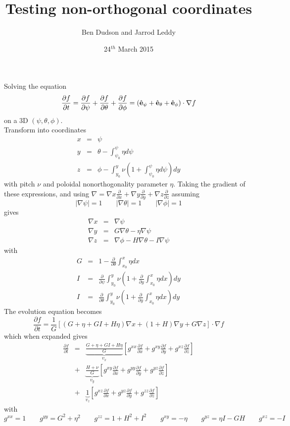 \documentclass[12pt,a4paper]{article}
\title{ Testing non-orthogonal coordinates }%
\author{ Ben Dudson and Jarrod Leddy }%
\date{ 24$^{th}$ March 2015 }%
\begin{document}
\maketitle %
\thispagestyle{fancy}%

Solving the equation
\[
\frac{\partial f}{\partial t} = \frac{\partial f}{\partial \psi} + \frac{\partial f}{\partial \theta} + \frac{\partial f}{\partial \phi} = \left(\hat{\bf{e}}_\psi + \hat{\bf{e}}_\theta + \hat{\bf{e}}_\phi\right)\cdot\nabla f
\]
on a 3D $\left(\psi, \theta, \phi\right)$.\\

Transform into coordinates
\begin{eqnarray*}
x &=& \psi \\
y &=& \theta - \int_{\psi_0}^\psi \eta d\psi  \\
z &=& \phi - \int_{y_0}^y \nu\left( 1 + \int_{\psi_0}^{\psi} \eta d\psi \right) dy
\end{eqnarray*}
with pitch $\nu$ and poloidal nonorthogonality parameter $\eta$. Taking the gradient of these expressions, and
using $\nabla = \nabla x \frac{\partial}{\partial x} + \nabla y \frac{\partial}{\partial y} + \nabla z\frac{\partial}{\partial z}$ assuming
\[
\left|\nabla\psi\right| = 1 \qquad \left|\nabla\theta\right| = 1 \qquad \left|\nabla\phi\right| = 1
\]
gives
\begin{eqnarray*}
\nabla x &=& \nabla \psi \\
\nabla y &=& G\nabla \theta - \eta \nabla \psi \\
\nabla z &=& \nabla \phi - H \nabla \theta - I\nabla\psi
\end{eqnarray*}
with
\begin{eqnarray*}
G &=& 1 - \frac{\partial}{\partial\theta}\int_{x_0}^x \eta dx \\
I &=& \frac{\partial}{\partial\psi}\int_{y_0}^y \nu\left(1+ \frac{\partial}{\partial y}\int_{x_0}^x \eta dx \right) dy \\
I &=& \frac{\partial}{\partial\theta}\int_{y_0}^y \nu\left(1+ \frac{\partial}{\partial y}\int_{x_0}^x \eta dx \right) dy
\end{eqnarray*}
The evolution equation becomes
\[
\frac{\partial f}{\partial t} = \frac{1}{G}\left[ \left( G + \eta+GI+H\eta \right)\nabla x + \left(1 + H\right) \nabla y + G\nabla z \right] \cdot \nabla f
\]
which when expanded gives
\begin{eqnarray*}
\frac{\partial f}{\partial t} &=& \underbrace{\frac{G + \eta+GI+H\eta}{G}}_{v_x}\left[g^{xx} \frac{\partial f}{\partial x} + g^{xy} \frac{\partial f}{\partial y} + g^{xz}\frac{\partial f}{\partial z}\right] \\
&+& \underbrace{\frac{H + \nu}{G}}_{v_y}\left[g^{xy} \frac{\partial f}{\partial x} + g^{yy} \frac{\partial f}{\partial y} + g^{yz}\frac{\partial f}{\partial z}\right] \\
&+& \underbrace{1}_{v_z}\left[g^{xz} \frac{\partial f}{\partial x} + g^{yz}\frac{\partial f}{\partial y} + g^{zz} \frac{\partial f}{\partial z}\right]
\end{eqnarray*}
with
\[
g^{xx} = 1 \qquad g^{yy} = G^2+\eta^2 \qquad g^{zz} = 1 + H^2 + I^2 \qquad g^{xy} = -\eta \qquad g^{yz} = \eta I - GH \qquad g^{xz} = -I 
\]
\end{document}
